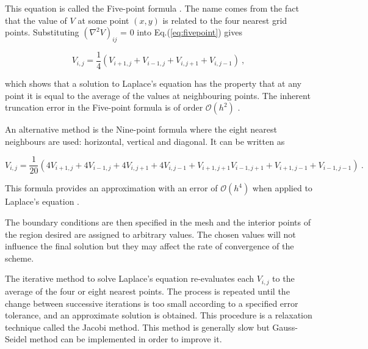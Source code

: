 \documentclass[a4paper]{jpconf}
\begin{document}
\noindent This equation is called the Five-point formula \cite{Cheney.Kincai-NumericalMethods}. The name comes from the fact that the value of $V$ at some point $(x,y)$ is related to the four nearest grid points. Substituting $(\nabla^2 V)_{ij}$ = 0 into Eq.(\ref{eq:fivepoint}) gives 

\begin{equation}
V_{i,j} = \frac{1}{4}(V_{i+1,j} + V_{i-1,j} + V_{i,j+1} + V_{i,j-1})~,
\end{equation}

\noindent which shows that a solution to Laplace's equation has the property that at any point it is equal to the average of the values at neighbouring points. The inherent truncation error in the Five-point formula is of order $\mathcal{O}(h^2)$ \cite{Cheney.Kincai-NumericalMethods}.  \par

An alternative method is the Nine-point formula where the eight nearest neighbours are used: horizontal, vertical and diagonal. It can be written as


\begin{equation}
V_{i,j} = \frac{1}{20}(4V_{i+1,j} + 4V_{i-1,j} + 4V_{i,j+1} + 4V_{i,j-1} + V_{i+1,j+1} V_{i-1,j+1} + V_{i+1,j-1} + V_{i-1,j-1})~.
\end{equation}

\noindent This formula provides an approximation with an error of $\mathcal{O}(h^4)$ when applied to Laplace's equation \cite{AI-numericalAna}. 

The boundary conditions are then specified in the mesh and the interior points of the region desired are assigned to arbitrary values. The chosen values will not influence the final solution but they may affect the rate of convergence of the scheme. \par

The iterative method to solve Laplace's equation re-evaluates each $V_{i,j}$ to the average of the four or eight nearest points. The process is repeated until the change between successive iterations is too small according to a specified error tolerance, and an approximate solution is obtained. 
This procedure is a relaxation technique called the Jacobi method. This method is generally slow but Gauss-Seidel method can be implemented in order to improve it. \par
\end{document}
